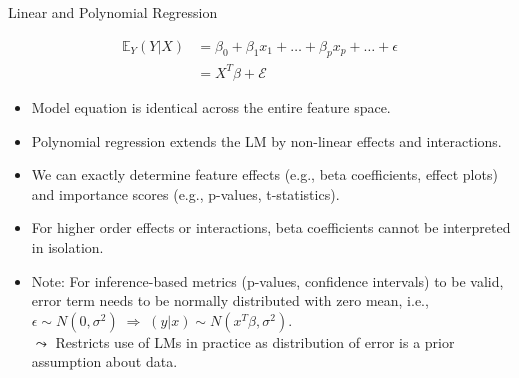 \documentclass[11pt,compress,t,notes=noshow, aspectratio=169, xcolor=table]{beamer}
\begin{document}
\begin{frame}{Linear and Polynomial Regression}

\begin{align*}
\mathbb{E}_Y(Y \vert X) &= \beta_0 + \beta_1 x_1 + \dots + \beta_p x_p + \dots + \epsilon \\
 &= X^T\beta + \mathcal{E}
\end{align*}

\begin{itemize}
\itemsep1em
\item Model equation is identical across the entire feature space.
\item Polynomial regression extends the LM by non-linear effects and interactions.
\item We can exactly determine feature effects (e.g., beta coefficients, effect plots) and importance scores (e.g., p-values, t-statistics).
\item For higher order effects or interactions, beta coefficients cannot be interpreted in isolation.
\item Note: For inference-based metrics (p-values, confidence intervals) to be valid, error term needs to be normally distributed with zero mean, i.e., $\epsilon \sim N(0, \sigma^2) \; \Rightarrow \; (y \vert x) \sim N(x^T \beta, \sigma^2)$.\\
$\leadsto$ Restricts use of LMs in practice as distribution of error is a prior assumption about data.
\end{itemize}
\end{frame}
\end{document}
